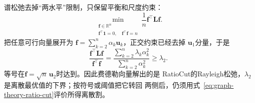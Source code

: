 谱松弛去掉“两水平”限制，只保留平衡和尺度约束：
\begin{equation}
  \min_{\substack{\bm{f}\in\mathbb{R}^n\\
                  \bm{f}^{\top}\bm{1}=0,\quad
                  \bm{f}^{\top}\bm{f}=n}}
  \frac1n\bm{f}^{\top}\bm{L}\bm{f}.
  \label{eq:graph-theory-ratio-cut-relaxation}
\end{equation}
把任意可行向量展开为
\(\bm{f}=\sum_{k=2}^{n}\alpha_k\bm{u}_k\)，正交约束已经去掉
\(\bm{u}_1\)分量，于是
\[
  \frac{\bm{f}^{\top}\bm{L}\bm{f}}
       {\bm{f}^{\top}\bm{f}}
  =
  \frac{\sum_{k=2}^{n}\lambda_k\alpha_k^2}
       {\sum_{k=2}^{n}\alpha_k^2}
  \geq\lambda_2.
\]
等号在\(\bm{f}=\sqrt n\,\bm{u}_2\)时达到。因此费德勒向量解出的是
RatioCut的Rayleigh松弛，\(\lambda_2\)是离散最优值的下界；按符号或阈值把它转回
两侧后，仍须用式~\eqref{eq:graph-theory-ratio-cut}评价所得离散割。


